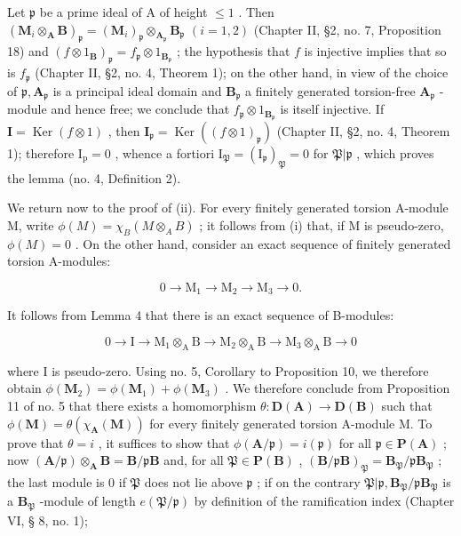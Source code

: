 Let \(\mathfrak{p}\) be a prime ideal of A of height \(\leqslant 1\) . Then \((\mathbf{M}_i\otimes_{\mathbf{A}}\mathbf{B})_{\mathfrak{p}} = (\mathbf{M}_i)_{\mathfrak{p}}\otimes_{\mathbf{A}_{\mathfrak{p}}}\mathbf{B}_{\mathfrak{p}}\) \((i = 1,2)\) (Chapter II, §2, no. 7, Proposition 18) and \((f\otimes 1_{\mathbf{B}})_{\mathfrak{p}} = f_{\mathfrak{p}}\otimes 1_{\mathbf{B}_{\mathfrak{p}}}\) ; the hypothesis that \(f\) is injective implies that so is \(f_{\mathfrak{p}}\) (Chapter II, §2, no. 4, Theorem 1); on the other hand, in view of the choice of \(\mathfrak{p},\mathbf{A}_{\mathfrak{p}}\) is a principal ideal domain and \(\mathbf{B}_{\mathfrak{p}}\) a finitely generated torsion-free \(\mathbf{A}_{\mathfrak{p}}\) -module and hence free; we conclude that \(f_{\mathfrak{p}}\otimes 1_{\mathbf{B}_{\mathfrak{p}}}\) is itself injective. If \(\mathbf{I} = \operatorname {Ker}(f\otimes 1)\) , then \(\mathbf{I}_{\mathfrak{p}} = \operatorname {Ker}((f\otimes 1)_{\mathfrak{p}})\) (Chapter II, §2, no. 4, Theorem 1); therefore \(\mathrm{I_p} = 0\) , whence a fortiori \(\mathrm{I}_{\mathfrak{P}} = (\mathrm{I}_{\mathfrak{p}})_{\mathfrak{P}} = 0\) for \(\mathfrak{P}| \mathfrak{p}\) , which proves the lemma (no. 4, Definition 2).

We return now to the proof of (ii). For every finitely generated torsion A-module M, write \(\phi(M) = \chi_{B}(M \otimes_{A} B)\) ; it follows from (i) that, if M is pseudo-zero, \(\phi(M) = 0\) . On the other hand, consider an exact sequence of finitely generated torsion A-modules:

\[
0 \rightarrow \mathrm{M} _ {1} \rightarrow \mathrm{M} _ {2} \rightarrow \mathrm{M} _ {3} \rightarrow 0.
\]

It follows from Lemma 4 that there is an exact sequence of B-modules:

\[
0 \rightarrow \mathrm{I} \rightarrow \mathrm{M} _ {1} \otimes_ {\mathrm{A}} \mathrm{B} \rightarrow \mathrm{M} _ {2} \otimes_ {\mathrm{A}} \mathrm{B} \rightarrow \mathrm{M} _ {3} \otimes_ {\mathrm{A}} \mathrm{B} \rightarrow 0
\]

where I is pseudo-zero. Using no. 5, Corollary to Proposition 10, we therefore obtain \(\phi(\mathbf{M}_2) = \phi(\mathbf{M}_1) + \phi(\mathbf{M}_3)\) . We therefore conclude from Proposition 11 of no. 5 that there exists a homomorphism \(\theta: \mathbf{D}(\mathbf{A}) \to \mathbf{D}(\mathbf{B})\) such that \(\phi(\mathbf{M}) = \theta(\chi_{\mathbf{A}}(\mathbf{M}))\) for every finitely generated torsion A-module M. To prove that \(\theta = i\) , it suffices to show that \(\phi(\mathbf{A}/\mathfrak{p}) = i(\mathfrak{p})\) for all \(\mathfrak{p} \in \mathbf{P}(\mathbf{A})\) ; now \((\mathbf{A}/\mathfrak{p}) \otimes_{\mathbf{A}} \mathbf{B} = \mathbf{B}/\mathfrak{p}\mathbf{B}\) and, for all \(\mathfrak{P} \in \mathbf{P}(\mathbf{B})\) , \((\mathbf{B}/\mathfrak{p}\mathbf{B})_{\mathfrak{P}} = \mathbf{B}_{\mathfrak{P}}/\mathfrak{p}\mathbf{B}_{\mathfrak{P}}\) ; the last module is 0 if \(\mathfrak{P}\) does not lie above \(\mathfrak{p}\) ; if on the contrary \(\mathfrak{P}| \mathfrak{p}, \mathbf{B}_{\mathfrak{P}}/\mathfrak{p}\mathbf{B}_{\mathfrak{P}}\) is a \(\mathbf{B}_{\mathfrak{P}}\) -module of length \(e(\mathfrak{P}/\mathfrak{p})\) by definition of the ramification index (Chapter VI, § 8, no. 1);

